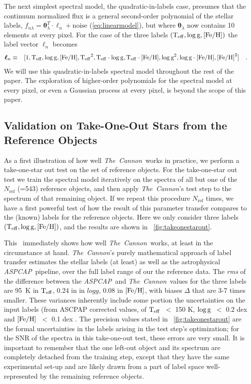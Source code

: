 \documentclass[12pt, preprint]{aastex}
\newcommand{\tc}{\textsl{The~Cannon}}
\newcommand{\aspcap}{\textsl{ASPCAP}}
\newcommand{\set}[1]{\bm{#1}}
\newcommand{\starlabel}{\ell}
\newcommand{\starlabelvec}{\set{\starlabel}}
\newcommand{\teff}{\mbox{$\rm T_{eff}$}}
\newcommand{\feh}{\mbox{$\rm [Fe/H]$}}
\newcommand{\logg}{\mbox{$\rm \log g$}}
\newcommand{\rfn}{\mathrm{ref}}
\begin{document}
The next simplest spectral model, the quadratic-in-labels case,
 presumes that the continuum normalized flux is a general second-order polynomial of the stellar labels, $f_{n\lambda} =
\set{\theta}_\lambda^T \cdot \starlabelvec_n + \mbox{noise}$ 
(\ref{eq:linearmodel}), 
but where $\set{\theta}_\lambda$ now contains 10 elements at every pixel.
For the case of the three labels $(\teff , \logg , \feh)$ the label vector $\starlabelvec_n$
becomes  
\begin{eqnarray}
\starlabelvec_n &\equiv&
[1, \teff, \logg, \feh, \teff^2, \teff\cdot\logg, \teff\cdot\feh, \logg^2, \logg\cdot\feh, \feh^2]
 \label{eq:quadinthreelabels}\quad.
\end{eqnarray}
We will use this quadratic-in-labels spectral model throughout the rest of the paper. 
The exploration of higher-order polynomials for the spectral model at every pixel, or even a Gaussian process at every pixel, is beyond the scope of this paper. 
 
\subsection{Validation on Take-One-Out Stars from the Reference Objects}
\label{sec:take-one-out}

As a first illustration of how well \tc\ works in practice, we perform a take-one-star out test on the set of reference objects.
For the take-one-star out test we train the spectral model iteratively on the spectra of all but one of the $N_\rfn$ (=543) 
reference objects, and then apply \tc 's test step to the spectrum of that remaining object. If we repeat this procedure $N_\rfn$ times, 
we have a first powerful test of how the result of this parameter transfer compares to the (known) labels for the reference objects.
 Here we only consider three labels $(\teff , \logg , \feh)$, and the results are shown in \figurename~\ref{fig:takeonestarout}.

This \figurename\ immediately shows how well \tc\ works, at least in the circumstance at hand.
\tc 's purely mathematical approach of label transfer estimates the stellar labels (at least) as well as the astrophysical \aspcap\ pipeline,
over the full label range of our the reference data. The \textit{rms} of the difference between the \aspcap\ and \tc\ values for the three labels are
95~K in $\teff$, 0.24 in in $logg$, 0.08 in $\feh$, with biases $\Delta$ that are 3-7 times smaller.  
These variances inherently include some portion the uncertainties on the input labels (from ASCPAP corrected values, 
of \teff\ $<$ 150 K, \logg\ $<$ 0.2 dex and \feh\ $<$ 0.1 dex \citep{Meszaros2013}.
The precision values stated in \figurename~\ref{fig:takeonestarout} are the formal uncertainties in the labels arising 
in the test step's optimization; for the SNR of the spectra in this take-one-out test, these errors are very small.
It is important to remember that the one left-out object and its spectrum are completely detached from the training step, 
except that they have the same experimental set-up and are likely drawn from a part of label space well-represented by the remaining reference objects.
\end{document}
